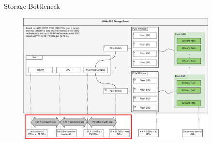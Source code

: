 \documentclass{beamer}
\begin{document}
% 
\begin{frame}{Storage Bottleneck}
	\begingroup
	\begin{figure}
		\centering
		\includegraphics[width=0.9\textwidth]{resources/images/storage-bottleneck.png}
	\end{figure}
	\endgroup
\end{frame}
\end{document}
